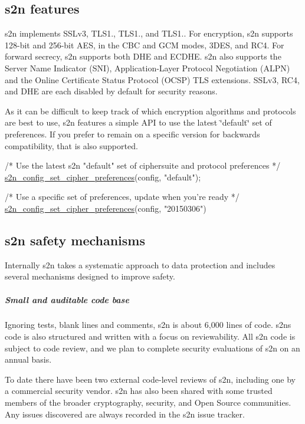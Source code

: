 \subsection*{s2n features}

s2n implements S\+S\+Lv3, T\+L\+S1., T\+L\+S1., and T\+L\+S1.. For encryption, s2n supports 128-\/bit and 256-\/bit A\+ES, in the C\+BC and G\+CM modes, 3\+D\+ES, and R\+C4. For forward secrecy, s2n supports both D\+HE and E\+C\+D\+HE. s2n also supports the Server Name Indicator (S\+NI), Application-\/\+Layer Protocol Negotiation (A\+L\+PN) and the Online Certificate Status Protocol (O\+C\+SP) T\+LS extensions. S\+S\+Lv3, R\+C4, and D\+HE are each disabled by default for security reasons.

As it can be difficult to keep track of which encryption algorithms and protocols are best to use, s2n features a simple A\+PI to use the latest \char`\"{}default\char`\"{} set of preferences. If you prefer to remain on a specific version for backwards compatibility, that is also supported.


\begin{DoxyCode}
\textcolor{comment}{/* Use the latest s2n "default" set of ciphersuite and protocol preferences */}
\hyperlink{s2n_8h_a21b09fcd09e2d33e8ed9389a109f2ab2}{s2n\_config\_set\_cipher\_preferences}(config, \textcolor{stringliteral}{"default"});

\textcolor{comment}{/* Use a specific set of preferences, update when you're ready */}
\hyperlink{s2n_8h_a21b09fcd09e2d33e8ed9389a109f2ab2}{s2n\_config\_set\_cipher\_preferences}(config, \textcolor{stringliteral}{"20150306"})
\end{DoxyCode}


\subsection*{s2n safety mechanisms}

Internally s2n takes a systematic approach to data protection and includes several mechanisms designed to improve safety.

\subparagraph*{Small and auditable code base}

Ignoring tests, blank lines and comments, s2n is about 6,000 lines of code. s2n\textquotesingle{}s code is also structured and written with a focus on reviewability. All s2n code is subject to code review, and we plan to complete security evaluations of s2n on an annual basis.

To date there have been two external code-\/level reviews of s2n, including one by a commercial security vendor. s2n has also been shared with some trusted members of the broader cryptography, security, and Open Source communities. Any issues discovered are always recorded in the s2n issue tracker.

